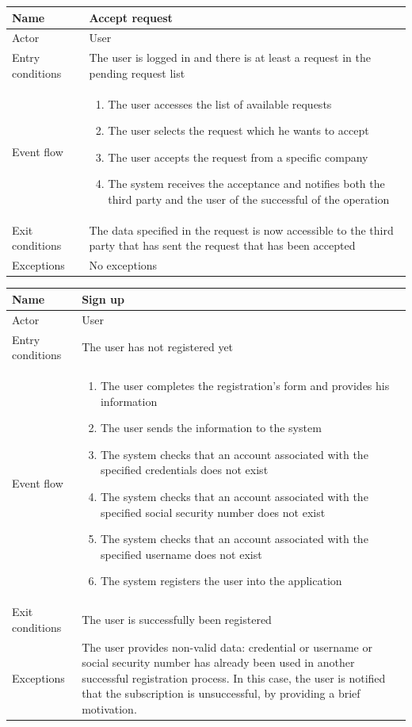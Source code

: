 \begin{table}[H]
\begin{tabularx}{\textwidth}{|l|X|}
\hline
 Name & Accept request\\ \hline
 Actor & User \\ \hline
 Entry conditions & The user is logged in and there is at least a request in the pending request list \\ \hline
 Event flow & 
 \begin{enumerate}
 	\item The user accesses the list of available requests
  	\item The user selects the request which he wants to accept
 	\item The user accepts the request from a specific company
 	\item The system receives the acceptance and notifies both the third party and the user of the successful of the operation
 \end{enumerate}   \\ \hline
 Exit conditions & The data specified in the request is now accessible to the third party that has sent the request that has been accepted\\ \hline
 Exceptions & No exceptions
 \\ \hline
\end{tabularx}
\end{table}


\begin{table}[H]
\begin{tabularx}{\textwidth}{|l|X|}
\hline
 Name & Sign up \\ \hline
 Actor & User \\ \hline
 Entry conditions & The user has not registered yet \\ \hline
 Event flow & 
 \begin{enumerate}
  	\item The user completes the registration's form and provides his information
 	\item The user sends the information to the system
 	\item The system checks that an account associated with the specified credentials does not exist
 	\item The system checks that an account associated with the specified social security number does not exist
 	\item The system checks that an account associated with the specified username does not exist
 	\item The system registers the user into the application
 \end{enumerate}   \\ \hline
 Exit conditions & The user is successfully been registered \\ \hline
 Exceptions & The user provides non-valid data: credential or username or social security number has already been used in another successful registration process. In this case, the user is notified that the subscription is unsuccessful, by providing a brief motivation. 
 \\ \hline
\end{tabularx}
\end{table}


